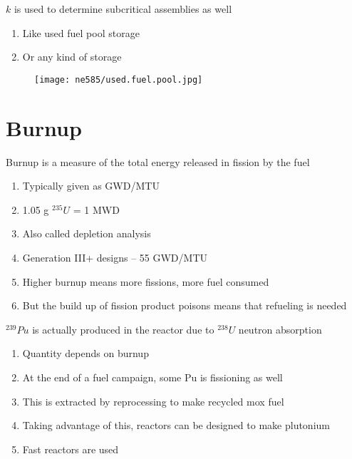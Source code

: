 \documentclass[aspectratio=1610,pdftex,dvipsnames,compress,xcolor={dvipsnames}]{beamer}
\newcommand{\acf}{\acrfull} %
\begin{document}
\begin{frame}{$k$ is used to determine subcritical assemblies as well}
    \begin{enumerate}[series=outerlist,topsep=0pt,itemsep=21pt,leftmargin=*,label=(\arabic*)]
        \item[]Like used fuel pool storage
        \item[]Or any kind of storage
    \end{enumerate}
\end{frame}


\begin{frame}{}
    \begin{figure}
        \centering
        \texttt{[image: ne585/used.fuel.pool.jpg]}
    \end{figure}
\end{frame}


\section{Burnup}


\addtocounter{framenumber}{-1} 
\begin{frame}{Burnup is a measure of the total energy released in fission by the fuel}
    \begin{enumerate}[series=outerlist,topsep=0pt,itemsep=21pt,leftmargin=*,label=(\arabic*)]
        \item[]Typically given as GWD/MTU
        \item[]1.05 g $^{235}U$ = 1 MWD
        \item[]Also called depletion analysis
        \item[]Generation III+ designs -- 55 GWD/MTU
        \item[]Higher burnup means more fissions, more fuel consumed
        \item[]But the build up of fission product poisons means that refueling is needed
    \end{enumerate}
\end{frame}


\begin{frame}{$^{239}Pu$ is actually produced in the reactor due to $^{238}U$ neutron absorption}
    \begin{enumerate}[series=outerlist,topsep=0pt,itemsep=21pt,leftmargin=*,label=(\arabic*)]
        \item[]Quantity depends on burnup
        \item[]At the end of a fuel campaign, some Pu is fissioning as well
        \item[]This is extracted by reprocessing to make recycled \acf{mox} fuel
        \item[]Taking advantage of this, reactors can be designed to make plutonium
        \item[]Fast reactors are used
    \end{enumerate}
\end{frame}
\end{document}
